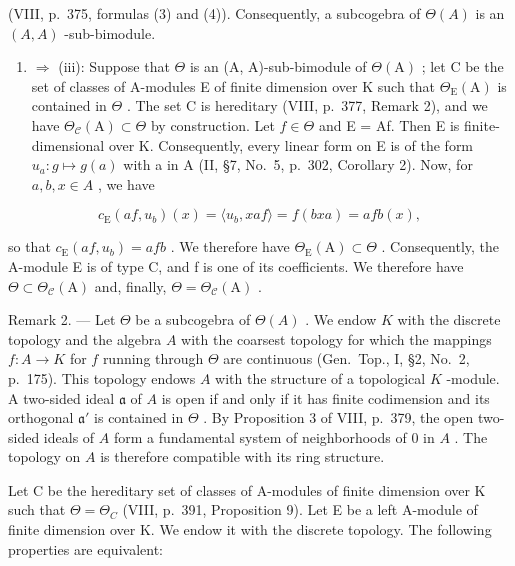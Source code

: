 (VIII, p.~375, formulas (3) and (4)). Consequently, a subcogebra of \(\Theta(A)\) is an \((A, A)\) -sub-bimodule.

\begin{enumerate}
\def\labelenumi{(\roman{enumi})}
\tightlist
\item
  \(\Rightarrow\) (iii): Suppose that \(\Theta\) is an (A, A)-sub-bimodule of \(\Theta(\mathrm{A})\) ; let C be the set of classes of A-modules E of finite dimension over K such that \(\Theta_{\mathrm{E}}(\mathrm{A})\) is contained in \(\Theta\) . The set C is hereditary (VIII, p.~377, Remark 2), and we have \(\Theta_{\mathcal{C}}(\mathrm{A}) \subset \Theta\) by construction. Let \(f \in \Theta\) and E = Af. Then E is finite-dimensional over K. Consequently, every linear form on E is of the form \(u_{a}: g \mapsto g(a)\) with a in A (II, §7, No.~5, p.~302, Corollary 2). Now, for \(a, b, x \in A\) , we have
\end{enumerate}

\[
c _ {\mathrm{E}} (a f, u _ {b}) (x) = \langle u _ {b}, x a f \rangle = f (b x a) = a f b (x),
\]

so that \(c_{\mathrm{E}}(af, u_{b}) = afb\) . We therefore have \(\Theta_{\mathrm{E}}(\mathrm{A}) \subset \Theta\) . Consequently, the A-module E is of type C, and f is one of its coefficients. We therefore have \(\Theta \subset \Theta_{\mathcal{C}}(\mathrm{A})\) and, finally, \(\Theta = \Theta_{\mathcal{C}}(\mathrm{A})\) .

Remark 2. --- Let \(\Theta\) be a subcogebra of \(\Theta(A)\) . We endow \(K\) with the discrete topology and the algebra \(A\) with the coarsest topology for which the mappings \(f: A \to K\) for \(f\) running through \(\Theta\) are continuous (Gen.~Top., I, §2, No.~2, p.~175). This topology endows \(A\) with the structure of a topological \(K\) -module. A two-sided ideal \(\mathfrak{a}\) of \(A\) is open if and only if it has finite codimension and its orthogonal \(\mathfrak{a}'\) is contained in \(\Theta\) . By Proposition 3 of VIII, p.~379, the open two-sided ideals of \(A\) form a fundamental system of neighborhoods of \(0\) in \(A\) . The topology on \(A\) is therefore compatible with its ring structure.

Let C be the hereditary set of classes of A-modules of finite dimension over K such that \(\Theta = \Theta_{C}\) (VIII, p.~391, Proposition 9). Let E be a left A-module of finite dimension over K. We endow it with the discrete topology. The following properties are equivalent:

